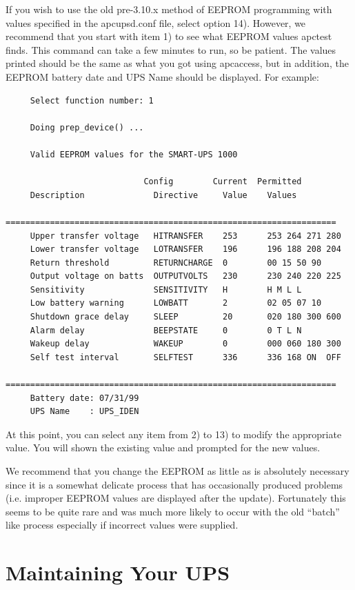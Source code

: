 {{{{{{If you wish to use the old pre-3.10.x method of EEPROM programming with values
specified in the apcupsd.conf file, select option 14). However, we recommend
that you start with item 1) to see what EEPROM values apctest finds. This
command can take a few minutes to run, so be patient. The values printed
should be the same as what you got using apcaccess, but in addition, the
EEPROM battery date and UPS Name should be displayed. For example: 

\footnotesize
\begin{verbatim}
     Select function number: 1
     
     Doing prep_device() ...
     
     Valid EEPROM values for the SMART-UPS 1000
     
                            Config        Current  Permitted
     Description              Directive     Value    Values
     ===================================================================
     Upper transfer voltage   HITRANSFER    253      253 264 271 280
     Lower transfer voltage   LOTRANSFER    196      196 188 208 204
     Return threshold         RETURNCHARGE  0        00 15 50 90
     Output voltage on batts  OUTPUTVOLTS   230      230 240 220 225
     Sensitivity              SENSITIVITY   H        H M L L
     Low battery warning      LOWBATT       2        02 05 07 10
     Shutdown grace delay     SLEEP         20       020 180 300 600
     Alarm delay              BEEPSTATE     0        0 T L N
     Wakeup delay             WAKEUP        0        000 060 180 300
     Self test interval       SELFTEST      336      336 168 ON  OFF
     ===================================================================
     Battery date: 07/31/99
     UPS Name    : UPS_IDEN
\end{verbatim}
\normalsize

At this point, you can select any item from 2) to 13) to modify the
appropriate value. You will shown the existing value and prompted for the new
values.  

We recommend that you change the EEPROM as little as is absolutely necessary
since it is a somewhat delicate process that has occasionally produced
problems (i.e. improper EEPROM values are displayed after the update).
Fortunately this seems to be quite rare and was much more likely to occur with
the old ``batch'' like process especially if incorrect values were supplied. 

\label{Maintaining-Your-UPS}

\section*{Maintaining Your UPS}

}}}}}}
